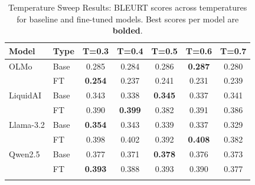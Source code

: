 \begin{table}[htbp]
\centering
\caption{Temperature Sweep Results: BLEURT scores across temperatures for baseline and fine-tuned models. Best scores per model are \textbf{bolded}.}
\label{tab:temperature_sweep}
\small
\begin{tabular}{llccccc}
\toprule
Model & Type & T=0.3 & T=0.4 & T=0.5 & T=0.6 & T=0.7 \\
\midrule
OLMo & Base & 0.285 & 0.284 & 0.286 & \textbf{0.287} & 0.280 \\
 & FT & \textbf{0.254} & 0.237 & 0.241 & 0.231 & 0.239 \\
\addlinespace
LiquidAI & Base & 0.343 & 0.338 & \textbf{0.345} & 0.337 & 0.341 \\
 & FT & 0.390 & \textbf{0.399} & 0.382 & 0.391 & 0.386 \\
\addlinespace
Llama-3.2 & Base & \textbf{0.354} & 0.343 & 0.339 & 0.337 & 0.329 \\
 & FT & 0.398 & 0.402 & 0.392 & \textbf{0.408} & 0.382 \\
\addlinespace
Qwen2.5 & Base & 0.377 & 0.371 & \textbf{0.378} & 0.376 & 0.373 \\
 & FT & \textbf{0.393} & 0.388 & 0.393 & 0.390 & 0.377 \\
\addlinespace
\bottomrule
\end{tabular}
\end{table}
